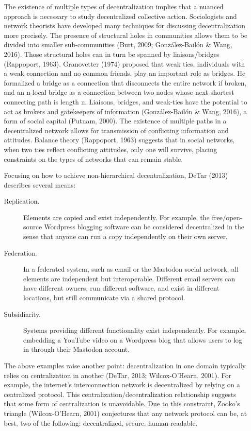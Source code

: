 The existence of multiple types of decentralization implies that a nuanced approach is necessary to study decentralized collective action. Sociologists and network theorists have developed many techniques for discussing decentralization more precisely. The presence of structural holes in communities allows them to be divided into smaller sub-communities (Burt, 2009; Gonz\'alez-Bail\'on \& Wang, 2016). Those structural holes can in turn be spanned by liaisons/bridges (Rappoport, 1963). Granovetter (1974) proposed that weak ties, individuals with a weak connection and no common friends, play an important role as bridges. He formalized a bridge as a connection that disconnects the entire network if broken, and an n-local bridge as a connection between two nodes whose next shortest connecting path is length n. Liaisons, bridges, and weak-ties have the potential to act as brokers and gatekeepers of information (Gonz\'alez-Bail\'on \& Wang, 2016), a form of social capital (Putnam, 2000). The existence of multiple paths in a decentralized network allows for transmission of conflicting information and attitudes. Balance theory (Rappoport, 1963) suggests that in social networks, when two ties reflect conflicting attitudes, only one will survive, placing constraints on the types of networks that can remain stable.

Focusing on how to achieve non-hierarchical decentralization, DeTar (2013) describes several means:

\begin{description}
\item[Replication.]{Elements are copied and exist independently. For example, the free/open-source Wordpress blogging software can be considered decentralized in the sense that anyone can run a copy independently on their own server.}
\item[Federation.]{In a federated system, such as email or the Mastodon social network, all elements are independent but interoperable. Different email servers can have different owners, run different software, and exist in different locations, but still communicate via a shared protocol.}
\item[Subsidiarity.]{Systems providing different functionality exist independently. For example, embedding a YouTube video on a Wordpress blog that allows users to log in through their Mastodon account.}
\end{description}

The above examples raise another point: decentralization in one domain typically relies on centralization in another (DeTar, 2013; Wilcox-O'Hearn, 2001). For example, the internet's interconnection network is decentralized by relying on a centralized protocol. This centralization/decentralization relationship suggests that some form of centralization is unavoidable. Due to this constraint, Zooko's triangle (Wilcox-O'Hearn, 2001) conjectures that any network protocol can be, at best, two of the following: decentralized, secure, human-readable.

